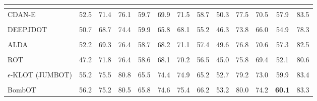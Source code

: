 \begin{table}[t]
\begin{footnotesize}
\begin{tabular}{lcccccccccccc}
       \citep{mmnist-ganin2016domain}\\
       \midrule
       CDAN-E & \multirow{2}{*}{52.5} & \multirow{2}{*}{71.4} & \multirow{2}{*}{76.1} & \multirow{2}{*}{59.7}  & \multirow{2}{*}{69.9} & \multirow{2}{*}{71.5} & \multirow{2}{*}{58.7}  & \multirow{2}{*}{50.3} & \multirow{2}{*}{77.5} & \multirow{2}{*}{70.5} & \multirow{2}{*}{57.9} & \multirow{2}{*}{83.5} \\ 
       \citep{Long2017ConditionalAD}\\
       \midrule
       DEEPJDOT & \multirow{2}{*}{50.7} &  \multirow{2}{*}{68.7} & \multirow{2}{*}{74.4} & \multirow{2}{*}{59.9}  & \multirow{2}{*}{65.8} & \multirow{2}{*}{68.1} & \multirow{2}{*}{55.2}  & \multirow{2}{*}{46.3} & \multirow{2}{*}{73.8} & \multirow{2}{*}{66.0} & \multirow{2}{*}{54.9} & \multirow{2}{*}{78.3} \\
       \citep{damodaran2018deepjdot}\\
       \midrule
       ALDA & \multirow{2}{*}{52.2} & \multirow{2}{*}{69.3} & \multirow{2}{*}{76.4} & \multirow{2}{*}{58.7}  & \multirow{2}{*}{68.2} & \multirow{2}{*}{71.1} & \multirow{2}{*}{57.4} & \multirow{2}{*}{49.6} & \multirow{2}{*}{76.8} & \multirow{2}{*}{70.6} & \multirow{2}{*}{57.3} & \multirow{2}{*}{82.5} \\
       \citep{Chen2020AdversarialLearnedLF}\\
       \midrule
       ROT & \multirow{2}{*}{47.2} & \multirow{2}{*}{71.8} & \multirow{2}{*}{76.4} & \multirow{2}{*}{58.6}  & \multirow{2}{*}{68.1} & \multirow{2}{*}{70.2} & \multirow{2}{*}{56.5}  & \multirow{2}{*}{45.0} & \multirow{2}{*}{75.8} & \multirow{2}{*}{69.4} & \multirow{2}{*}{52.1} & \multirow{2}{*}{80.6} \\
       \citep{ROT}\\
       \midrule
       $\epsilon$-KLOT (JUMBOT) & \multirow{2}{*}{55.2} & \multirow{2}{*}{75.5} & \multirow{2}{*}{80.8} & \multirow{2}{*}{65.5}  & \multirow{2}{*}{74.4} & \multirow{2}{*}{74.9} & \multirow{2}{*}{65.2}  & \multirow{2}{*}{52.7} & \multirow{2}{*}{79.2} & \multirow{2}{*}{73.0} & \multirow{2}{*}{59.9} & \multirow{2}{*}{83.4}\\
       \citep{jumbot}\\
       \midrule
       BombOT & \multirow{2}{*}{56.2} & \multirow{2}{*}{75.2} & \multirow{2}{*}{80.5} & \multirow{2}{*}{65.8}  & \multirow{2}{*}{74.6} & \multirow{2}{*}{75.4} & \multirow{2}{*}{66.2}  & \multirow{2}{*}{53.2} & \multirow{2}{*}{80.0} & \multirow{2}{*}{74.2} & \multirow{2}{*}{\textbf{60.1}} & \multirow{2}{*}{83.3} \\

\end{tabular}
\end{footnotesize}
\end{table}
